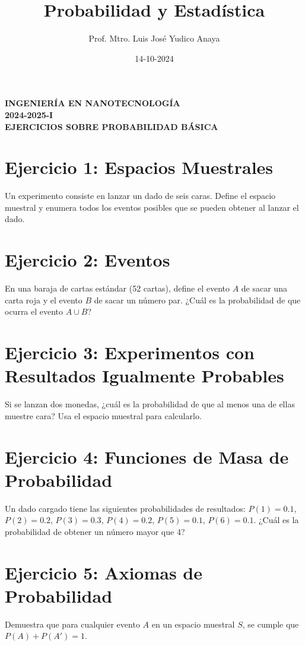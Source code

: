 \documentclass[a4paper,openright,10pt]{article}
\begin{document}
\title{Probabilidad y Estadística}
\author{Prof. Mtro. Luis Jos\'{e} Yudico Anaya}
\date{14-10-2024}
\maketitle

\begin{center}
\textbf{INGENIERÍA EN NANOTECNOLOGÍA}\\
\vspace{.5cm}
\textbf{2024-2025-I}\\
\vspace{.5cm}
\textbf{EJERCICIOS SOBRE PROBABILIDAD BÁSICA}
\end{center}


\section*{Ejercicio 1: Espacios Muestrales}
Un experimento consiste en lanzar un dado de seis caras. Define el espacio muestral y enumera todos los eventos posibles que se pueden obtener al lanzar el dado.

\section*{Ejercicio 2: Eventos}
En una baraja de cartas estándar (52 cartas), define el evento \( A \) de sacar una carta roja y el evento \( B \) de sacar un número par. ¿Cuál es la probabilidad de que ocurra el evento \( A \cup B \)?

\section*{Ejercicio 3: Experimentos con Resultados Igualmente Probables}
Si se lanzan dos monedas, ¿cuál es la probabilidad de que al menos una de ellas muestre cara? Usa el espacio muestral para calcularlo.

\section*{Ejercicio 4: Funciones de Masa de Probabilidad}
Un dado cargado tiene las siguientes probabilidades de resultados: \( P(1) = 0.1 \), \( P(2) = 0.2 \), \( P(3) = 0.3 \), \( P(4) = 0.2 \), \( P(5) = 0.1 \), \( P(6) = 0.1 \). ¿Cuál es la probabilidad de obtener un número mayor que 4?

\section*{Ejercicio 5: Axiomas de Probabilidad}
Demuestra que para cualquier evento \( A \) en un espacio muestral \( S \), se cumple que \( P(A) + P(A') = 1 \).
\end{document}
